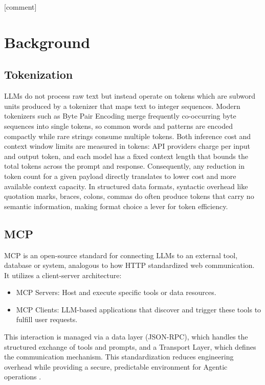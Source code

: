 \documentclass[10pt,twocolumn,letterpaper]{article}
\begin{document}
[comment]

\section{Background}
\subsection{Tokenization}

LLMs do not process raw text but instead operate on tokens which are subword units produced by a tokenizer that maps text to integer sequences. Modern tokenizers such as Byte Pair Encoding \citep{sennrich2016neural} merge frequently co-occurring byte sequences into single tokens, so common words and patterns are encoded compactly while rare strings consume multiple tokens. Both inference cost and context window limits are measured in tokens: API providers charge per input and output token, and each model has a fixed context length that bounds the total tokens across the prompt and response. Consequently, any reduction in token count for a given payload directly translates to lower cost and more available context capacity. In structured data formats, syntactic overhead like quotation marks, braces, colons, commas do often produce tokens that carry no semantic information, making format choice a lever for token efficiency.

\subsection{MCP}

MCP is an open-source standard for connecting LLMs to an external tool, database or system, analogous to how HTTP standardized web communication. It utilizes a client-server architecture:

\begin{itemize}
    \item MCP Servers: Host and execute specific tools or data resources.
    \item MCP Clients: LLM-based applications that discover and trigger these tools to fulfill user requests.
\end{itemize}

This interaction is managed via a data layer (JSON-RPC), which handles the structured exchange of tools and prompts, and a Transport Layer, which defines the communication mechanism. This standardization reduces engineering overhead while providing a secure, predictable environment for Agentic operations \citep{mcp2026}. 
\end{document}
